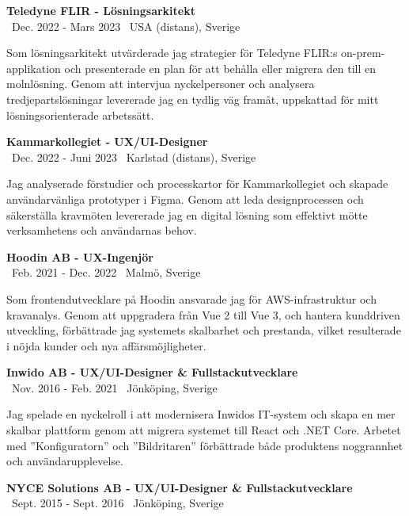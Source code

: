 \documentclass[a4paper,10pt]{article}
\begin{document}
\vspace{0.5cm}
\textbf{Teledyne FLIR - Lösningsarkitekt}\\
\normalsize \faCalendar \ Dec. 2022 - Mars 2023 \quad \faMapMarker \ USA (distans), Sverige

Som lösningsarkitekt utvärderade jag strategier för Teledyne FLIR:s on-prem-applikation och presenterade en plan för att behålla eller migrera den till en molnlösning. Genom att intervjua nyckelpersoner och analysera tredjepartslösningar levererade jag en tydlig väg framåt, uppskattad för mitt lösningsorienterade arbetssätt.

\vspace{0.5cm}
\textbf{Kammarkollegiet - UX/UI-Designer}\\
\normalsize \faCalendar \ Dec. 2022 - Juni 2023 \quad \faMapMarker \ Karlstad (distans), Sverige

Jag analyserade förstudier och processkartor för Kammarkollegiet och skapade användarvänliga prototyper i Figma. Genom att leda designprocessen och säkerställa kravmöten levererade jag en digital lösning som effektivt mötte verksamhetens och användarnas behov.

\vspace{0.5cm}
\textbf{Hoodin AB - UX-Ingenjör}\\
\normalsize \faCalendar \ Feb. 2021 - Dec. 2022 \quad \faMapMarker \ Malmö, Sverige

Som frontendutvecklare på Hoodin ansvarade jag för AWS-infrastruktur och kravanalys. Genom att uppgradera från Vue 2 till Vue 3, och hantera kunddriven utveckling, förbättrade jag systemets skalbarhet och prestanda, vilket resulterade i nöjda kunder och nya affärsmöjligheter.

\vspace{0.5cm}
\textbf{Inwido AB - UX/UI-Designer \& Fullstackutvecklare}\\
\normalsize \faCalendar \ Nov. 2016 - Feb. 2021 \quad \faMapMarker \ Jönköping, Sverige

Jag spelade en nyckelroll i att modernisera Inwidos IT-system och skapa en mer skalbar plattform genom att migrera systemet till React och .NET Core. Arbetet med ”Konfiguratorn” och ”Bildritaren” förbättrade både produktens noggrannhet och användarupplevelse.

\vspace{0.5cm}
\textbf{NYCE Solutions AB - UX/UI-Designer \& Fullstackutvecklare}\\
\normalsize \faCalendar \ Sept. 2015 - Sept. 2016 \quad \faMapMarker \ Jönköping, Sverige
\end{document}
